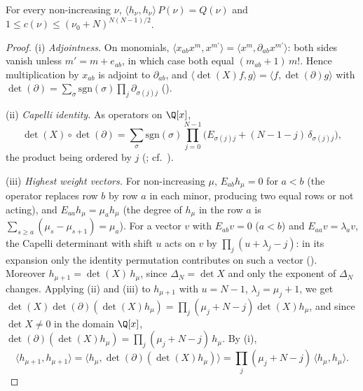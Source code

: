 \begin{lemma}\label{pf:top-shape:hook}
For every non-increasing $\nu$, $\langle h_\nu,h_\nu\rangle\,P(\nu)=Q(\nu)$ and $1\le c(\nu)\le(\nu_0+N)^{N(N-1)/2}$.
\end{lemma}

\begin{proof}
(i) \emph{Adjointness.} On monomials, $\langle x_{ab}x^m,x^{m'}\rangle=\langle x^m,\partial_{ab}x^{m'}\rangle$: both sides
vanish unless $m'=m+e_{ab}$, in which case both equal $(m_{ab}+1)\,m!$. Hence multiplication by $x_{ab}$ is adjoint to
$\partial_{ab}$, and $\langle\det(X)f,g\rangle=\langle f,\det(\partial)g\rangle$ with
$\det(\partial)=\sum_\sigma\mathrm{sgn}(\sigma)\prod_j\partial_{\sigma(j)j}$
().

(ii) \emph{Capelli identity.} As operators on $\Q[x]$,
\[
\det(X)\circ\det(\partial)=\sum_\sigma\mathrm{sgn}(\sigma)\prod_{j=0}^{N-1}\bigl(E_{\sigma(j)j}+(N-1-j)\,\delta_{\sigma(j)j}\bigr),
\]
the product being ordered by $j$ (; cf.\
\cite{HoweUmeda1991}).

(iii) \emph{Highest weight vectors.} For non-increasing $\mu$, $E_{ab}h_\mu=0$ for $a<b$ (the operator replaces row $b$ by
row $a$ in each minor, producing two equal rows or not acting), and $E_{aa}h_\mu=\mu_ah_\mu$ (the degree of $h_\mu$ in the
row $a$ is $\sum_{s\ge a}(\mu_s-\mu_{s+1})=\mu_a$). For a vector $v$ with $E_{ab}v=0$ ($a<b$) and $E_{aa}v=\lambda_av$, the
Capelli determinant with shift $u$ acts on $v$ by $\prod_j(u+\lambda_j-j)$: in its expansion only the identity
permutation contributes on such a vector ().
Moreover $h_{\mu+1}=\det(X)\,h_\mu$, since $\Delta_N=\det X$ and only the exponent of $\Delta_N$ changes. Applying (ii) and
(iii) to $h_{\mu+1}$ with $u=N-1$, $\lambda_j=\mu_j+1$, we get $\det(X)\det(\partial)(\det(X)h_\mu)=\prod_j(\mu_j+N-j)\det(X)h_\mu$,
and since $\det X\ne0$ in the domain $\Q[x]$, $\det(\partial)(\det(X)h_\mu)=\prod_j(\mu_j+N-j)\,h_\mu$. By (i),
\begin{equation}\label{eq:pf:top-shape:shift}
\langle h_{\mu+1},h_{\mu+1}\rangle=\langle h_\mu,\det(\partial)(\det(X)h_\mu)\rangle=\prod_j(\mu_j+N-j)\,\langle h_\mu,h_\mu\rangle .
\end{equation}


\end{proof}
